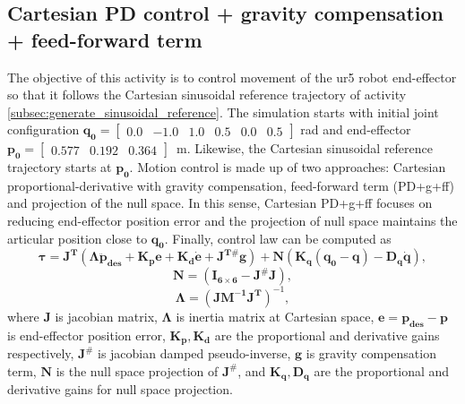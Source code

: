 \graphicspath{{images/act_1.7/}}
\subsection{Cartesian PD control + gravity compensation + feed-forward term}
The objective of this activity is to control movement of the ur5 robot end-effector so that it follows the Cartesian sinusoidal reference trajectory of activity \ref{subsec:generate_sinusoidal_reference}. The simulation starts with initial joint configuration $\mathbf{q_0}=\begin{bmatrix} 0.0 & -1.0 & 1.0 & 0.5 & 0.0 & 0.5 \end{bmatrix}$ rad and end-effector $\mathbf{p_0}=\begin{bmatrix}  0.577 &   0.192 &   0.364 \end{bmatrix}$~m. Likewise, the Cartesian sinusoidal reference trajectory starts at $\mathbf{p_0}$. Motion control is made up of two approaches: Cartesian proportional-derivative with gravity compensation, feed-forward term (PD+g+ff) and projection of the null space. In this sense, Cartesian PD+g+ff focuses on reducing end-effector position error and the projection of null space maintains the articular position close to $\mathbf{q_0}$. Finally, control law can be computed as 
\begin{equation}
	\boldsymbol{\tau}
	= \mathbf{J^T} (\boldsymbol{\Lambda}\mathbf{\ddot{p}_{des}} +\mathbf{K_p e} + \mathbf{K_d \dot{e}}+ \mathbf{J^{T\#} g}) + \mathbf{N} \left(\mathbf{K_q(q_0-q) - D_q \dot{q}} \right),
	\label{eq:cartesian_PD_g_ff_N}
\end{equation}
\begin{equation*}
	\mathbf{N}=(\mathbf{I_{6 \times 6}} - \mathbf{J^{\#} J} ),
\end{equation*}
\begin{equation*}
	\boldsymbol{\Lambda}= (\mathbf{J M^{-1} J^{T}})^{-1},
\end{equation*}
\noindent where $\mathbf{J}$ is jacobian matrix, $\boldsymbol{\Lambda}$ is inertia matrix at Cartesian space, $\mathbf{e}=\mathbf{p_{des} - p}$ is end-effector position error, $\mathbf{K_p, K_d}$ are the proportional and derivative gains respectively, $\mathbf{J^{\#}}$ is jacobian damped pseudo-inverse, $\mathbf{g}$ is gravity compensation term, $\mathbf{N}$ is the null space projection of $\mathbf{J^{\#}}$, and $\mathbf{K_q, D_q}$ are the proportional and derivative gains for null space projection. \vspace{.5cm}

